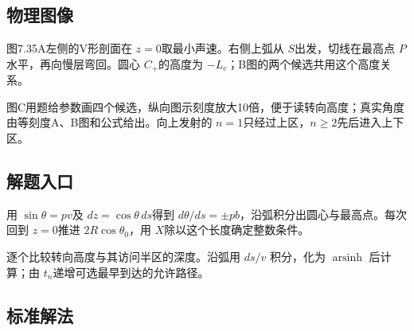 \documentclass[UTF8,fontset=fandol,a4paper,11pt]{ctexart}
\begin{document}


\subsection*{物理图像}

图7.35A左侧的V形剖面在 $z=0$取最小声速。右侧上弧从 $S$出发，切线在最高点 $P$水平，再向慢层弯回。圆心 $C_+$的高度为 $-L_c$；B图的两个候选共用这个高度关系。

图C用题给参数画四个候选，纵向图示刻度放大10倍，便于读转向高度；真实角度由等刻度A、B图和公式给出。向上发射的 $n=1$只经过上区，$n\ge2$先后进入上下区。




\subsection*{解题入口}

用 $\sin\theta=pv$及 $dz=\cos\theta\,ds$得到 $d\theta/ds=\pm pb$，沿弧积分出圆心与最高点。每次回到 $z=0$推进 $2R\cos\theta_0$，用 $X$除以这个长度确定整数条件。

逐个比较转向高度与其访问半区的深度。沿弧用 $ds/v$ 积分，化为 $\operatorname{arsinh}$ 后计算；由 $t_n$递增可选最早到达的允许路径。



\subsection*{标准解法}
\end{document}
